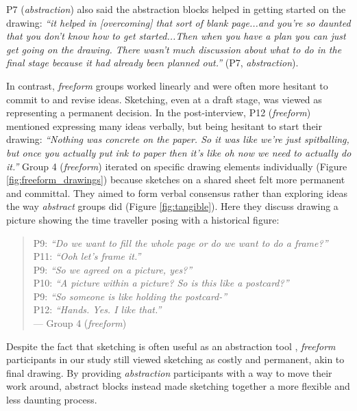 P7 (\textit{abstraction}) also said the abstraction blocks helped in getting started on the drawing: \textit{``it helped in [overcoming] that sort of blank page...and you're so daunted that you don't know how to get started...Then when you have a plan you can just get going on the drawing. There wasn't much discussion about what to do in the final stage because it had already been planned out.''} (P7, \textit{abstraction}).

In contrast, \textit{freeform} groups worked linearly and were often more hesitant to commit to and revise ideas. 
Sketching, even at a draft stage, was viewed as representing a permanent decision. In the post-interview, P12 (\textit{freeform}) mentioned expressing many ideas verbally, but being hesitant to start their drawing: \textit{``Nothing was concrete on the paper. So it was like we're just spitballing, but once you actually put ink to paper then it's like oh now we need to actually do it.''} Group 4 (\textit{freeform}) iterated on specific drawing elements individually (Figure \ref{fig:freeform_drawings}) because sketches on a shared sheet felt more permanent and committal. They aimed to form verbal consensus rather than exploring ideas the way \textit{abstract} groups did (Figure \ref{fig:tangible}). Here they discuss drawing a picture showing the time traveller posing with a historical figure:

\begin{quote}
    P9: \textit{``Do we want to fill the whole page or do we want to do a frame?''}\\
    P11: \textit{``Ooh let's frame it.''}\\
    P9: \textit{``So we agreed on a picture, yes?''}\\
    P10: \textit{``A picture within a picture? So is this like a postcard?''}\\
    P9: \textit{``So someone is like holding the postcard-''}\\
    P12: \textit{``Hands. Yes. I like that.''}\\
    --- Group 4 (\textit{freeform})
\end{quote}

Despite the fact that sketching is often useful as an abstraction tool \cite{Buxton2007,Tversky2009}, \textit{freeform} participants in our study still viewed sketching as costly and permanent, akin to final drawing. By providing \textit{abstraction} participants with a way to move their work around, abstract blocks instead made sketching together a more flexible and less daunting process.

